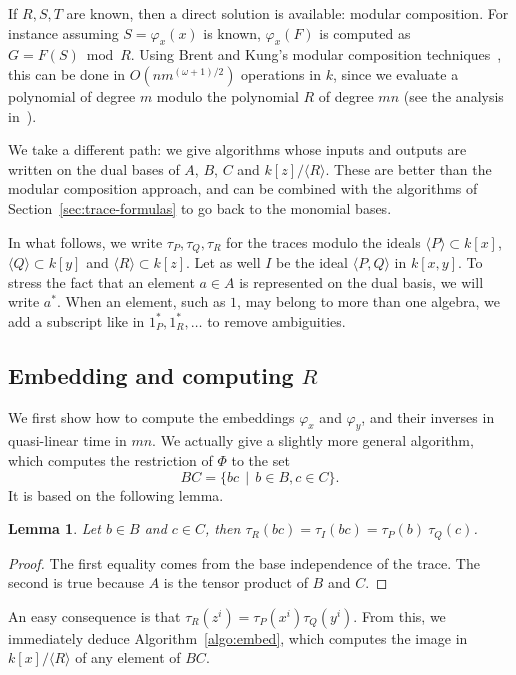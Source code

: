 \documentclass[12pt]{article}
\newcommand{\ang}[1]{\langle#1\rangle}
\newtheorem{Lemma}{Lemma}
\begin{document}
If $R,S,T$ are known, then a direct solution is available: modular
composition. For instance assuming $S=\varphi_x(x)$ is known,
$\varphi_x(F)$ is computed as $G=F(S) \bmod R$. Using Brent and Kung's
modular composition techniques~\cite{brent+kung}, this can be done in
$O(n m^{(\omega+1)/2})$ operations in $k$, since we evaluate a
polynomial of degree $m$ modulo the polynomial $R$ of degree $mn$ (see
the analysis in~\cite{shoup94}).

We take a different path: we give algorithms whose inputs and outputs
are written on the dual bases of $A$, $B$, $C$ and
$k[z]/\ang{R}$. These are better than the modular composition
approach, and can be combined with the algorithms of
Section~\ref{sec:trace-formulas} to go back to the monomial bases.

In what follows, we write $\tau_P,\tau_Q,\tau_R$ for the traces modulo
the ideals $\langle P\rangle\subset k[x]$, $\langle Q \rangle \subset
k[y]$ and $\langle R \rangle \subset k[z]$. Let as well $I$ be the
ideal $\langle P, Q\rangle$ in $k[x,y]$. To stress the fact that an
element $a\in A$ is represented on the dual basis, we will write
$a^\ast$. When an element, such as $1$, may belong to more than one
algebra, we add a subscript like in $1_P^\ast, 1_R^\ast, \dots$ to
remove ambiguities.




\subsection{Embedding and computing $R$} 

We first show how to compute the embeddings $\varphi_x$ and
$\varphi_y$, and their inverses in quasi-linear time in $mn$. We
actually give a slightly more general algorithm, which computes the
restriction of $\Phi$ to the set $$BC = \{bc \,\mid\, b\in B, c\in
C\}.$$
It is based on the following lemma.

\begin{Lemma}
  Let $b\in B$ and $c \in C$, then $\tau_R(bc) = \tau_I(bc) =
  \tau_P(b) \ \tau_Q(c)$.
\end{Lemma}
\begin{proof}
  The first equality comes from the base independence of the
  trace. The second is true because $A$ is the tensor product of $B$
  and $C$.
\end{proof}

An easy consequence is that $\tau_R(z^i) =
\tau_P(x^i)\tau_Q(y^i)$. From this, we immediately deduce
Algorithm~\ref{algo:embed}, which computes the image in $k[x]/\ang{R}$
of any element of $BC$.
\end{document}
